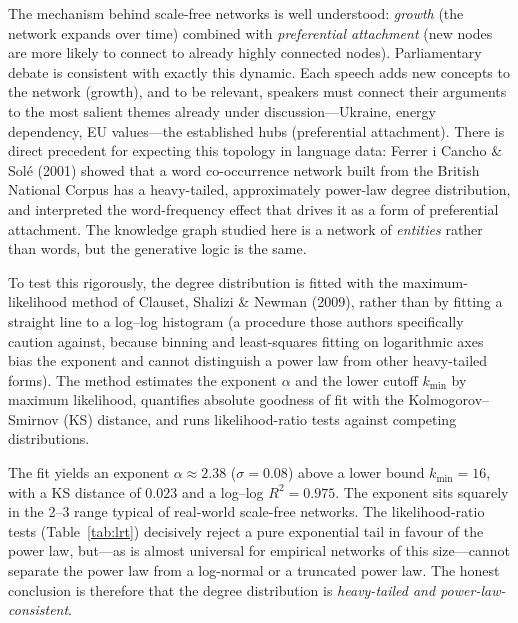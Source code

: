 \documentclass[11pt]{article}
\begin{document}
The mechanism behind scale-free networks is well understood: \emph{growth} (the network expands over time) combined with \emph{preferential attachment} (new nodes are more likely to connect to already highly connected nodes). Parliamentary debate is consistent with exactly this dynamic. Each speech adds new concepts to the network (growth), and to be relevant, speakers must connect their arguments to the most salient themes already under discussion---Ukraine, energy dependency, EU values---the established hubs (preferential attachment). There is direct precedent for expecting this topology in language data: Ferrer i Cancho \& Sol\'{e} (2001) showed that a word co-occurrence network built from the British National Corpus has a heavy-tailed, approximately power-law degree distribution, and interpreted the word-frequency effect that drives it as a form of preferential attachment. The knowledge graph studied here is a network of \emph{entities} rather than words, but the generative logic is the same.

To test this rigorously, the degree distribution is fitted with the maximum-likelihood method of Clauset, Shalizi \& Newman (2009), rather than by fitting a straight line to a log--log histogram (a procedure those authors specifically caution against, because binning and least-squares fitting on logarithmic axes bias the exponent and cannot distinguish a power law from other heavy-tailed forms). The method estimates the exponent $\alpha$ and the lower cutoff $k_{\min}$ by maximum likelihood, quantifies absolute goodness of fit with the Kolmogorov--Smirnov (KS) distance, and runs likelihood-ratio tests against competing distributions.

The fit yields an exponent $\alpha \approx 2.38$ ($\sigma = 0.08$) above a lower bound $k_{\min}=16$, with a KS distance of $0.023$ and a log--log $R^2 = 0.975$. The exponent sits squarely in the 2--3 range typical of real-world scale-free networks. The likelihood-ratio tests (Table~\ref{tab:lrt}) decisively reject a pure exponential tail in favour of the power law, but---as is almost universal for empirical networks of this size---cannot separate the power law from a log-normal or a truncated power law. The honest conclusion is therefore that the degree distribution is \emph{heavy-tailed and power-law-consistent}.
\end{document}
